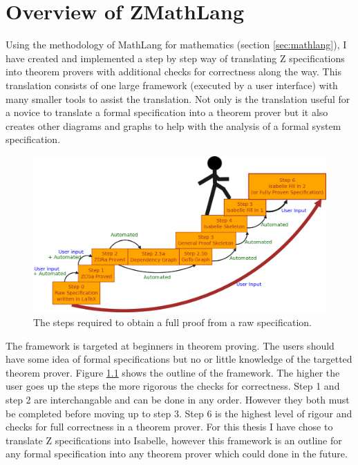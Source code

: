 
\chapter{Overview of ZMathLang}
\label{ch:design}

Using the methodology of MathLang for mathematics (section \ref{sec:mathlang}), I have created and implemented a step by step way of translating Z specifications into theorem provers with additional checks for correctness along the way. This translation consists of one large framework (executed by a user interface) with many smaller tools to assist the translation. Not only is the translation useful for a novice to translate a formal specification into a theorem prover but it also creates other diagrams and graphs to help with the analysis of a formal system specification.

\begin{figure}[H]
 \begin{center}
 \includegraphics [width=12cm]{Figures/Design/mathlangsteps.png}
 \caption{The steps required to obtain a full proof from a raw specification.}
 \label{fig:steps}
\end{center}
\end{figure} 

The framework is targeted at beginners in theorem proving. The users should have some idea of formal specifications but no or little knowledge of the targetted theorem prover. Figure \ref{fig:steps} shows the outline of the framework. The higher the user goes up the steps the more rigorous the checks for correctness. Step 1 and step 2 are interchangable and can be done in any order. However they both must be completed before moving up to step 3. Step 6 is the highest level of rigour and checks for full correctness in a theorem prover. For this thesis I have chose to translate Z specifications into Isabelle, however this framework is an outline for any formal specification into any theorem prover which could done in the future.

